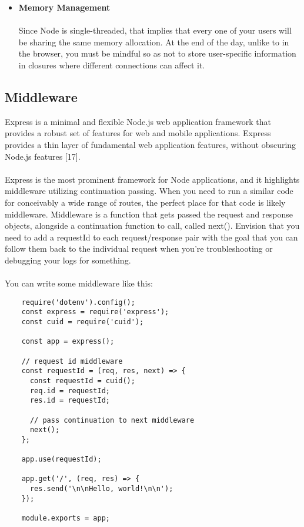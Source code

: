 \documentclass[thesis.tex]{subfiles}
\begin{document}
\begin{itemize}
    \paragraph{}
    \item \textbf{Memory Management}
    \paragraph{}
    Since Node is single-threaded, that implies that every one of your users will be sharing the same memory allocation. At the end of the day, unlike to in the browser, you must be mindful so as not to store user-specific information in closures where different connections can affect it.
    \paragraph{}
\end{itemize}
\subsection{Middleware}
Express is a minimal and flexible Node.js web application framework that provides a robust set of features for web and mobile applications.  Express provides a thin layer of fundamental web application features, without obscuring Node.js features [17].
\paragraph{}
Express is the most prominent framework for Node applications, and it highlights middleware utilizing continuation passing. When you need to run a similar code for conceivably a wide range of routes, the perfect place for that code is likely middleware. 
Middleware is a function that gets passed the request and response objects, alongside a continuation function to call, called next(). Envision that you need to add a requestId to each request/response pair with the goal that you can follow them back to the individual request when you're troubleshooting or debugging your logs for something.
\paragraph{}
You can write some middleware like this:
\begin{lstlisting}
    require('dotenv').config();
    const express = require('express');
    const cuid = require('cuid');
    
    const app = express();
    
    // request id middleware
    const requestId = (req, res, next) => {
      const requestId = cuid();
      req.id = requestId;
      res.id = requestId;
    
      // pass continuation to next middleware
      next();
    };
    
    app.use(requestId);
    
    app.get('/', (req, res) => {
      res.send('\n\nHello, world!\n\n');
    });
    
    module.exports = app;
    
\end{lstlisting}
\newpage
\end{document}
